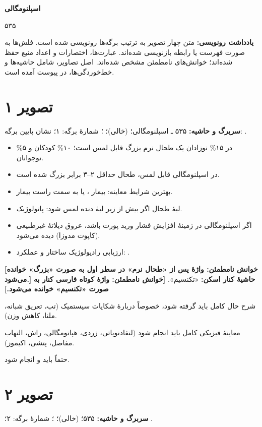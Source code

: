 \documentclass[12pt,a4paper]{article}
\begin{document}
\fi
\providecommand{\SplenoUnclear}[1]{\textbf{[خوانش نامطمئن: #1]}}
\providecommand{\SplenoPage}[2]{\clearpage\section*{تصویر #1}\lr{\texttt{#2}}\par}

\begin{center}
{\Large\bfseries اسپلنومگالی}\par
{}\par
۵۳۵
\end{center}
\textbf{یادداشت رونویسی:} متن چهار تصویر به ترتیب برگه‌ها رونویسی شده است. فلش‌ها به صورت فهرست یا رابطه بازنویسی شده‌اند. عبارت‌ها، اختصارات و اعداد منبع حفظ شده‌اند؛ خوانش‌های نامطمئن مشخص شده‌اند. اصل تصاویر، شامل حاشیه‌ها و خط‌خوردگی‌ها، در پیوست آمده است.

\SplenoPage{۱}{pic01.jpg}
\textbf{سربرگ و حاشیه:} ۵۳۵ ـ اسپلنومگالی؛  (خالی)؛ ؛ شمارهٔ برگه: ۱؛ نشان پایین برگه: .
\begin{itemize}
\item در ۱۵\% نوزادان یک طحال نرم بزرگ قابل لمس است؛ ۱۰\% کودکان و ۵\% نوجوانان.
\item در اسپلنومگالی قابل لمس، طحال حداقل ۲–۳ برابر بزرگ شده است.
\item بهترین شرایط معاینه: بیمار ، یا به سمت راست بیمار.
\item لبهٔ طحال اگر بیش از \lr{2 cm} زیر لبهٔ دنده لمس شود: پاتولوژیک.
\item اگر اسپلنومگالی در زمینهٔ افزایش فشار ورید پورت باشد، عروق دیلاتهٔ غیرطبیعی (کاپوت مدوزا) دیده می‌شود.
\item ارزیابی رادیولوژیک ساختار و عملکرد: .
\end{itemize}
\SplenoUnclear{واژهٔ پس از «طحال نرم» در سطر اول به صورت «بزرگ» خوانده می‌شود.}
\textbf{حاشیهٔ کنار اسکن:} «تکنسیم». \SplenoUnclear{واژهٔ کوتاه فارسی کنار  به صورت «تکنسیم» خوانده می‌شود.}

شرح حال کامل باید گرفته شود، خصوصاً دربارهٔ شکایات سیستمیک (تب، تعریق شبانه، ملنا، کاهش وزن).

معاینهٔ فیزیکی کامل باید انجام شود (لنفادنوپاتی، زردی، هپاتومگالی، راش، التهاب مفاصل، پتشی، اکیموز).

حتماً باید  و  انجام شود.

\SplenoPage{۲}{pic02.jpg}
\textbf{سربرگ و حاشیه:} ۵۳۵؛  (خالی)؛ ؛ شمارهٔ برگه: ۲؛ .
\end{document}
